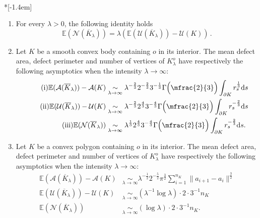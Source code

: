 \documentclass[AHL,Unicode,longabstracts,published]{cedram}
\newcommand{\cA}{\mathcal{A}}
\newcommand{\cN}{\mathcal{N}}
\newcommand{\cU}{\mathcal{U}}
\newcommand{\dd}{\mathrm{d}}
\newcommand{\E}{\mathbb{E}}
\newcommand*{\alphenumi}{\renewcommand*{\theenumi}{\alph{enumi}}}
\begin{document}
\goodbreak
\begin{theo}\label{theo:crofton}\ \\*[-1.4em]
\begin{enumerate}\alphenumi
\item \label{theo7.1.a}For every $\lambda>0$, the following identity holds
\begin{equation*}
\E(\cN(\overline{K}_\lambda))=\lambda(\E(\cU(\overline{K}_\lambda))-\cU(K))\,.
\end{equation*}
\pagebreak
\item\label{theo7.1.b} Let $K$ be a smooth convex body containing $o$ in its interior. The mean defect area, defect perimeter and number of vertices of $K_{\lambda}^o$ have respectively the following asymptotics when the intensity $\lambda\to\infty$:
\begin{align}
\tag{$\rm i$}\label{theo7.1.b.1} \E(\cA(\overline{K}_{\lambda}))-\cA(K) &\underset{\lambda\to\infty}{\sim} \lambda^{-\frac{2}{3}}2^{-\frac{2}{3}}3^{-\frac1{3}}\Gamma\Big(\mfrac{2}{3}\Big)
 \int_{\partial K}r_s^{\frac1{3}} \dd s\\
\tag{$\rm ii$}\label{theo7.1.b.2} \E(\cU(\overline{K}_{\lambda}))-\cU(K) &\underset{\lambda\to\infty}{\sim}
\lambda^{-\frac{2}{3}}2^{\frac43}3^{-\frac{4}{3}}\Gamma\Big(\mfrac{2}{3}\Big)
\int_{\partial K} r_s^{-\frac{2}{3}}\dd s \\
\tag{$\rm iii$}\label{theo7.1.b.3} \E(\cN(\overline{K}_\lambda)) &\underset{\lambda\to\infty}{\sim} \lambda^{\frac1{3}}2^{\frac43}3^{-\frac{4}{3}}\Gamma\Big(\mfrac{2}{3}\Big)
\int_{\partial K} r_s^{-\frac{2}{3}}\dd s.
\end{align}

\item\label{theo7.1.c} Let $K$ be a convex polygon containing $o$ in its interior. The mean defect area, defect perimeter and number of vertices of $K_{\lambda}^o$ have respectively the following asymptotics when the intensity $\lambda\to\infty:$
\begin{align}
\tag{$\rm i$}\label{theo7.1.c.1} \E(\cA(\overline{K}_\lambda))-\cA(K) &\underset{\lambda\to\infty}{\sim}\lambda^{-\frac1{2}}\displaystyle 2^{-\frac{5}{2}}\pi^{\frac{3}{2}} \sum_{i=1}^{n_K} \|a_{i+1}-a_i\|^{\frac{3}{2}} \\
\tag{$\rm ii$}\label{theo7.1.c.2} \E(\cU(\overline{K}_{\lambda}))-\cU(K) &\underset{\lambda\to\infty}{\sim} (\lambda^{-1}\log \lambda)\cdot2\cdot 3^{-1}n_K \\
\tag{$\rm iii$}\label{theo7.1.c.3} \E(\cN(\overline{K}_\lambda)) &\underset{\lambda\to\infty}{\sim}(\log\lambda)\cdot2\cdot 3^{-1}n_K.
\end{align}
\end{enumerate}
\end{theo}
\end{document}
